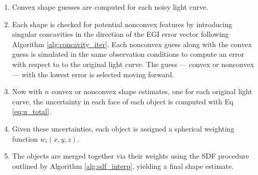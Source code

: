 \begin{enumerate}
  \item Convex shape guesses are computed for each noisy light curve.
  \item Each shape is checked for potential nonconvex features by introducing singular concavities in the direction of the EGI error vector following Algorithm \ref{alg:concavity_iter}. Each nonconvex guess along with the convex guess is simulated in the same observation conditions to compute an error with respect to to the original light curve. The guess --- convex or nonconvex --- with the lowest error is selected moving forward.
  \item Now with $n$ convex or nonconvex shape estimates, one for each original light curve, the uncertainty in each face of each object is computed with Eq \ref{eq:u_total}.
  \item Given these uncertainties, each object is assigned a spherical weighting function $w_i(x, y, z)$.
  \item The objects are merged together via their weights using the SDF procedure outlined by Algorithm \ref{alg:sdf_interp}, yielding a final shape estimate.
\end{enumerate}

